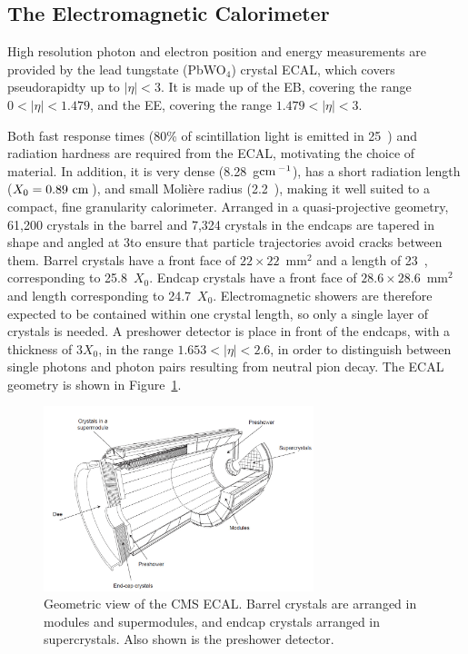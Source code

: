 \subsection{The Electromagnetic Calorimeter}
High resolution photon and electron position and energy measurements are provided by the lead tungstate (PbWO$_{4}$) crystal \ac{ECAL}, which covers pseudorapidty up to $|\eta|<3$.
It is made up of the \ac{EB}, covering the range $0<|\eta|<1.479$,
and the \ac{EE}, covering the range $1.479<|\eta|<3$.

Both fast response times (80\% of scintillation light is emitted in 25~\ns) and radiation hardness are required from the \ac{ECAL}, motivating the choice of material.
In addition, it is very dense (8.28~g$\mathrm{cm}\,^{-1}$), has a short radiation length ($X_{0} = 0.89~\mathrm{cm}\,$), and small Moli\`{e}re radius (2.2~\cm), making it well suited to a compact, fine granularity calorimeter.
Arranged in a quasi-projective geometry, 61,200 crystals in the barrel and 7,324 crystals in the endcaps are tapered in shape and angled at 3\deg to ensure that particle trajectories avoid cracks between them.
Barrel crystals have a front face of $22 \times 22$~mm$^{2}$ and a length of 23~\cm, corresponding to 25.8~$X_{0}$. 
Endcap crystals have a front face of $28.6 \times 28.6$~mm$^{2}$ and length corresponding to 24.7~$X_{0}$.
Electromagnetic showers are therefore expected to be contained within one crystal length, so only a single layer of crystals is needed. 
A preshower detector is place in front of the endcaps, with a thickness of $3X_{0}$, in the range $1.653<|\eta|<2.6$, in order to distinguish between single photons and photon pairs resulting from neutral pion decay. 
The \ac{ECAL} geometry is shown in Figure~\ref{fig:CMSecal}.

\begin{figure}[htbp]
  \begin{center}
  \includegraphics[width=0.7\textwidth]{Figures/detector/cmsECAL}
  \caption{Geometric view of the \ac{CMS} \ac{ECAL}. Barrel crystals are arranged in modules and supermodules, and endcap crystals arranged in supercrystals. Also shown is the preshower detector.
}
  \label{fig:CMSecal}
  \end{center}
\end{figure}

